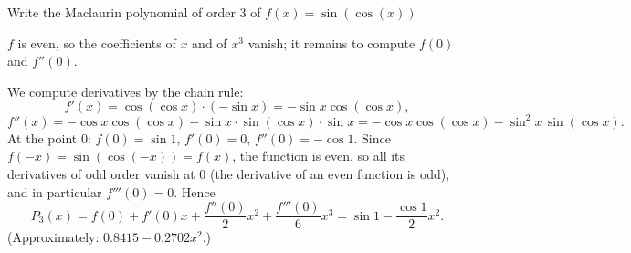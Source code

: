 
\begin{question}
Write the Maclaurin polynomial of order 3 of $f(x)=\sin(\cos(x))$
\end{question}

\begin{hint}
$f$ is even, so the coefficients of $x$ and of $x^3$ vanish; it remains to compute $f(0)$ and $f''(0)$.
\end{hint}

\begin{solution}
We compute derivatives by the chain rule:
\[ f'(x)=\cos(\cos x)\cdot(-\sin x)=-\sin x\cos(\cos x), \]
\[ f''(x)=-\cos x\cos(\cos x)-\sin x\cdot\sin(\cos x)\cdot\sin x=-\cos x\cos(\cos x)-\sin^2x\,\sin(\cos x). \]
At the point $0$: $f(0)=\sin1$, $f'(0)=0$, $f''(0)=-\cos1$. Since $f(-x)=\sin(\cos(-x))=f(x)$, the function is even, so all its derivatives of odd order vanish at $0$ (the derivative of an even function is odd), and in particular $f'''(0)=0$. Hence
\[ P_3(x)=f(0)+f'(0)x+\frac{f''(0)}{2}x^2+\frac{f'''(0)}{6}x^3=\boxed{\sin1-\frac{\cos1}{2}x^2}. \]
(Approximately: $0.8415-0.2702x^2$.)
\end{solution}
